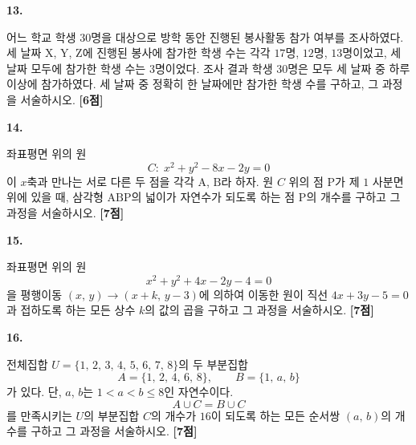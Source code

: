 \documentclass[10pt]{article}
\renewenvironment{problem}[2]{%
  \par%
  \setcounter{probnum}{#1}%
  \noindent
  \begin{minipage}[t]{\linewidth}%
  \setlength{\parskip}{4pt plus 1pt}%
  {\sffamily\bfseries\large\color{black}#1.}\par\smallskip\ignorespaces
}{%
  \end{minipage}\par%
}
\newcommand{\pts}[1]{\nobreak\hspace*{\fill}\textbf{[#1점]}\par}
\begin{document}
\clearpage

\setlength{\probboxheight}{195mm}

\noindent
\begin{minipage}[t][\probboxheight][t]{0.46\linewidth}\raggedright
\begin{problem}{13}{s}
어느 학교 학생 $30$명을 대상으로 방학 동안 진행된 봉사활동 참가 여부를 조사하였다. 세 날짜 $\mathrm{X}$, $\mathrm{Y}$, $\mathrm{Z}$에 진행된 봉사에 참가한 학생 수는 각각 $17$명, $12$명, $13$명이었고, 세 날짜 모두에 참가한 학생 수는 $3$명이었다. 조사 결과 학생 $30$명은 모두 세 날짜 중 하루 이상에 참가하였다. 세 날짜 중 정확히 한 날짜에만 참가한 학생 수를 구하고, 그 과정을 서술하시오. \pts{6}

\vspace{100mm}
\end{problem}
\end{minipage}%
\hfill
\begin{minipage}[t][\probboxheight][t]{0.46\linewidth}\raggedright
\begin{problem}{14}{s}
좌표평면 위의 원
$$C:\; x^{2}+y^{2}-8x-2y=0$$
이 $x$축과 만나는 서로 다른 두 점을 각각 $\mathrm{A}$, $\mathrm{B}$라 하자. 원 $C$ 위의 점 $\mathrm{P}$가 제 $1$ 사분면 위에 있을 때, 삼각형 $\mathrm{ABP}$의 넓이가 자연수가 되도록 하는 점 $\mathrm{P}$의 개수를 구하고 그 과정을 서술하시오. \pts{7}

\vspace{130mm}
\end{problem}
\end{minipage}

\clearpage

\begin{pagepair}
\noindent
\begin{minipage}[t]{0.46\linewidth}\raggedright
\begin{problem}{15}{s}
좌표평면 위의 원
$$x^{2}+y^{2}+4x-2y-4=0$$
을 평행이동 $(x,\,y)\to(x+k,\,y-3)$에 의하여 이동한 원이 직선 $4x+3y-5=0$과 접하도록 하는 모든 상수 $k$의 값의 곱을 구하고 그 과정을 서술하시오. \pts{7}
\end{problem}
\end{minipage}\hfill\begin{minipage}[t]{0.46\linewidth}\raggedright
\begin{problem}{16}{s}
전체집합 $U=\{1,\,2,\,3,\,4,\,5,\,6,\,7,\,8\}$의 두 부분집합
$$A=\{1,\,2,\,4,\,6,\,8\},\qquad B=\{1,\,a,\,b\}$$
가 있다. 단, $a$, $b$는 $1<a<b\le 8$인 자연수이다.
$$A\cup C = B\cup C$$
를 만족시키는 $U$의 부분집합 $C$의 개수가 $16$이 되도록 하는 모든 순서쌍 $(a,\,b)$의 개수를 구하고 그 과정을 서술하시오. \pts{7}
\end{problem}
\end{minipage}
\end{pagepair}
\end{document}
